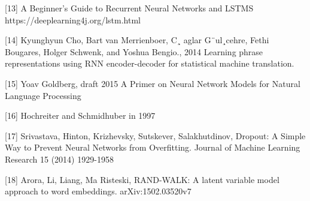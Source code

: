 \documentclass[10pt, twocolumn, letterpaper]{article}
\begin{document}
[13] A Beginner's Guide to Recurrent Neural Networks and LSTMS
https://deeplearning4j.org/lstm.html

[14] Kyunghyun Cho, Bart van Merrienboer, C¸ aglar G¨ul¸cehre, Fethi Bougares, Holger Schwenk, and Yoshua Bengio., 2014
Learning phrase representations using RNN encoder-decoder for statistical machine translation.

[15] Yoav Goldberg, draft 2015
A Primer on Neural Network Models for Natural Language Processing

[16] Hochreiter and Schmidhuber in 1997

[17] Srivastava, Hinton, Krizhevsky, Sutskever, Salakhutdinov, Dropout: A Simple Way to Prevent Neural Networks from Overfitting. Journal of Machine Learning Research 15 (2014) 1929-1958

[18] Arora, Li, Liang, Ma Risteski, RAND-WALK: A latent variable model approach to word embeddings. arXiv:1502.03520v7
\end{document}
